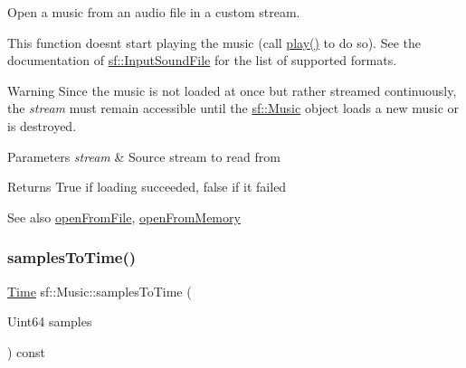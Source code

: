 Open a music from an audio file in a custom stream. 

This function doesn\textquotesingle{}t start playing the music (call \mbox{\hyperlink{classsf_1_1_sound_stream_afdc08b69cab5f243d9324940a85a1144}{play()}} to do so). See the documentation of \mbox{\hyperlink{classsf_1_1_input_sound_file}{sf\+::\+Input\+Sound\+File}} for the list of supported formats.

\begin{DoxyWarning}{Warning}
Since the music is not loaded at once but rather streamed continuously, the {\itshape stream} must remain accessible until the \mbox{\hyperlink{classsf_1_1_music}{sf\+::\+Music}} object loads a new music or is destroyed.
\end{DoxyWarning}

\begin{DoxyParams}{Parameters}
{\em stream} & Source stream to read from\\
\hline
\end{DoxyParams}
\begin{DoxyReturn}{Returns}
True if loading succeeded, false if it failed
\end{DoxyReturn}
\begin{DoxySeeAlso}{See also}
\mbox{\hyperlink{classsf_1_1_music_a3edc66e5f5b3f11e84b90eaec9c7d7c0}{open\+From\+File}}, \mbox{\hyperlink{classsf_1_1_music_ae93b21bcf28ff0b5fec458039111386e}{open\+From\+Memory}} \begin{DoxyVerb}\end{DoxyVerb}
 
\end{DoxySeeAlso}
\mbox{\label{classsf_1_1_music_aa6e80347f64dde5dcd4a260e42358ac5}} 
\subsubsection{\texorpdfstring{samplesToTime()}{samplesToTime()}}
{\footnotesize\ttfamily \mbox{\hyperlink{classsf_1_1_time}{Time}} sf\+::\+Music\+::samples\+To\+Time (\begin{DoxyParamCaption}\item[{Uint64}]{samples }\end{DoxyParamCaption}) const\hspace{0.3cm}{\ttfamily [private]}}




